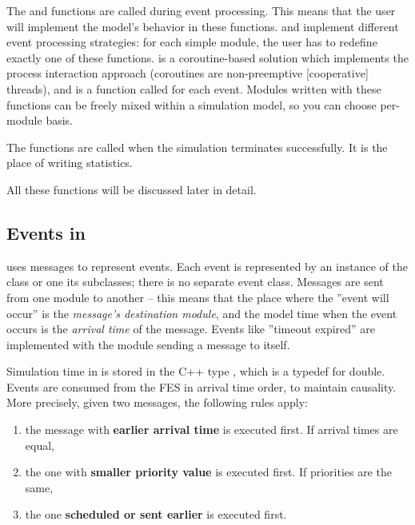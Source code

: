 The  and  functions are
called during event processing. This means that the user will
implement the model's behavior in these functions.
 and  implement
different event processing strategies: for each simple module, the user
has to redefine exactly one of these functions.  is
a coroutine-based solution which implements the
process interaction approach (coroutines are non-pre\-emp\-tive
[cooperative] threads), and  is a function
called for each event. Modules written with these functions can be
freely mixed within a simulation model, so you can choose per-module
basis.

The  functions are called when the simulation
terminates successfully. It is the place of writing statistics.

All these functions will be discussed later in detail.





\subsection{Events in {\opp}}

{\opp} uses messages to represent
events. Each event is represented by an instance of the
 class or one its subclasses; there is no separate
event class. Messages are sent from one module to another -- this
means that the place where the ''event will occur'' is the
\textit{message's destination module}, and the model time when the
event occurs is the \textit{arrival time} of the
message. Events like ''timeout expired'' are implemented with the
module sending a message to itself.

Simulation time in {\opp} is stored in the C++ type
, which is a typedef for double.\\
Events are consumed from the FES in arrival time order, to
maintain causality. More precisely, given two messages, the following
rules apply:
\begin{enumerate}
\item{the message with \textbf{earlier arrival time} is executed
    first.  If arrival times are equal,}
\item{the one with \textbf{smaller priority value} is executed first.
    If priorities are the same,}
\item{the one \textbf{scheduled or sent earlier} is executed first.}
\end{enumerate}

